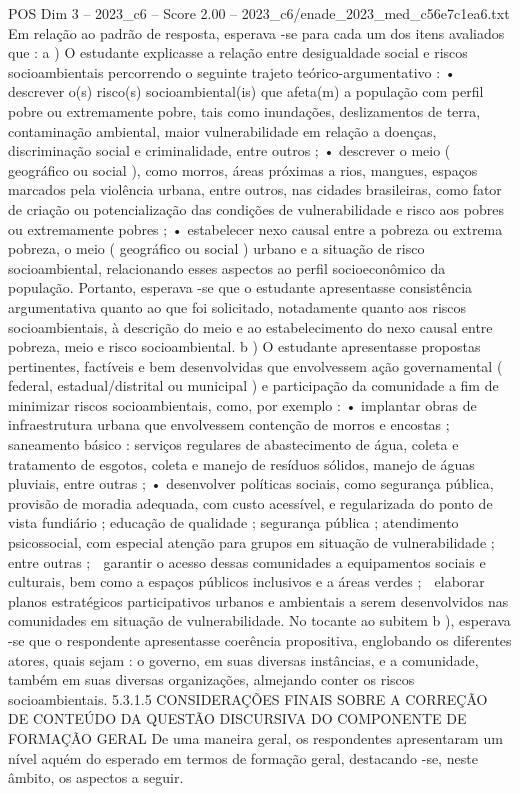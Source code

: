 \begin{textsample}{POS Dim 3 – 2023\_c6 – Score 2.00 – 2023\_c6/enade\_2023\_med\_c56e7c1ea6.txt}
Em relação ao padrão de resposta, esperava -se para cada um dos itens avaliados que : a ) O estudante explicasse a relação entre desigualdade social e riscos socioambientais percorrendo o seguinte trajeto teórico-argumentativo : • descrever o(s) risco(s) socioambiental(is) que afeta(m) a população com perfil pobre ou extremamente pobre, tais como inundações, deslizamentos de terra, contaminação ambiental, maior vulnerabilidade em relação a doenças, discriminação social e criminalidade, entre outros ; • descrever o meio ( geográfico ou social ), como morros, áreas próximas a rios, mangues, espaços marcados pela violência urbana, entre outros, nas cidades brasileiras, como fator de criação ou potencialização das condições de vulnerabilidade e risco aos pobres ou extremamente pobres ; • estabelecer nexo causal entre a pobreza ou extrema pobreza, o meio ( geográfico ou social ) urbano e a situação de risco socioambiental, relacionando esses aspectos ao perfil socioeconômico da população.
Portanto, esperava -se que o estudante apresentasse consistência argumentativa quanto ao que foi solicitado, notadamente quanto aos riscos socioambientais, à descrição do meio e ao estabelecimento do nexo causal entre pobreza, meio e risco socioambiental. b ) O estudante apresentasse propostas pertinentes, factíveis e bem desenvolvidas que envolvessem ação governamental ( federal, estadual/distrital ou municipal ) e participação da comunidade a fim de minimizar riscos socioambientais, como, por exemplo : • implantar obras de infraestrutura urbana que envolvessem contenção de morros e encostas ; saneamento básico : serviços regulares de abastecimento de água, coleta e tratamento de esgotos, coleta e manejo de resíduos sólidos, manejo de águas pluviais, entre outras ; • desenvolver políticas sociais, como segurança pública, provisão de moradia adequada, com custo acessível, e regularizada do ponto de vista fundiário ; educação de qualidade ; segurança pública ; atendimento psicossocial, com especial atenção para grupos em situação de vulnerabilidade ; entre outras ;  garantir o acesso dessas comunidades a equipamentos sociais e culturais, bem como a espaços públicos inclusivos e a áreas verdes ;  elaborar planos estratégicos participativos urbanos e ambientais a serem desenvolvidos nas comunidades em situação de vulnerabilidade.
No tocante ao subitem b ), esperava -se que o respondente apresentasse coerência propositiva, englobando os diferentes atores, quais sejam : o governo, em suas diversas instâncias, e a comunidade, também em suas diversas organizações, almejando conter os riscos socioambientais. 5.3.1.5 CONSIDERAÇÕES FINAIS SOBRE A CORREÇÃO DE CONTEÚDO DA QUESTÃO DISCURSIVA DO COMPONENTE DE FORMAÇÃO GERAL De uma maneira geral, os respondentes apresentaram um nível aquém do esperado em termos de formação geral, destacando -se, neste âmbito, os aspectos a seguir.

\end{textsample}
